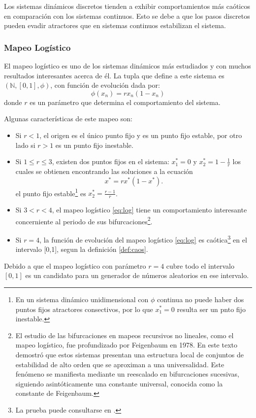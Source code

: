 \documentclass[../Main.tex]{subfiles}
\begin{document}
Los sistemas dinámicos discretos tienden a exhibir comportamientos más caóticos en comparación con los sistemas continuos. Esto se debe a que los pasos discretos pueden evadir atractores que en sistemas continuos estabilizan el sistema. 
\subsubsection{Mapeo Logístico}
El mapeo logístico es uno de los sistemas dinámicos más estudiados y con muchos resultados interesantes acerca de él. La tupla que define a este sistema es $(\mathbb{N},[0,1],\phi)$, con función de evolución dada por:
\begin{equation}
\label{eq:log}
    \phi(x_n) = r x_n (1 - x_n) 
\end{equation}
donde \(r\) es un parámetro que determina el comportamiento del sistema. 

 Algunas características de este mapeo son:

\begin{itemize}
    \item Si $r<1$, el origen es el único punto fijo y es un punto fijo estable, por otro lado si $r>1$ es un punto fijo inestable.
    \item Si $1\leq r \leq 3 $, existen dos puntos fijos en el sistema: $x_1^*=0$ y $x_2^*=1-\frac{1}{r}$ los cuales se obtienen encontrando las soluciones a la ecuación \[x^* = r x^* (1 - x^*).\] el punto fijo estable\footnote{En un sistema dinámico unidimensional con $\phi$ continua no puede haber dos puntos fijos atractores consectivos, por lo que $x_1^*=0$ resulta ser un pnto fijo inestable.} es $x_2^*=\frac{r-1}{r}$.
    \item Si $3<r<4$, el mapeo logístico \ref{eq:log} tiene un comportamiento interesante concerniente al periodo de sus  bifurcaciones\footnote{El estudio de las bifurcaciones en mapeos recursivos no lineales, como el mapeo logístico, fue profundizado por Feigenbaum en 1978\cite{Feigenbaum1978}. En este texto demostró que estos sistemas presentan una estructura local de conjuntos de estabilidad de alto orden que se aproximan a una universalidad. Este fenómeno se manifiesta mediante un reescalado en bifurcaciones sucesivas, siguiendo asintóticamente una constante universal, conocida como la constante de Feigenbaum.}.

    \item Si $r=4$, la función de evolución del mapeo logístico \ref{eq:log} es caótica\footnote{La prueba puede consultarse en \cite{devaney2021}.} en el intervalo [0,1], segun la definición \ref{def:caos}.
\end{itemize}
Debido a que el mapeo logístico con parámetro $r=4$ cubre todo el intervalo $[0,1]$ es un  candidato para un generador de números aleatorios en ese intervalo. 
\end{document}
